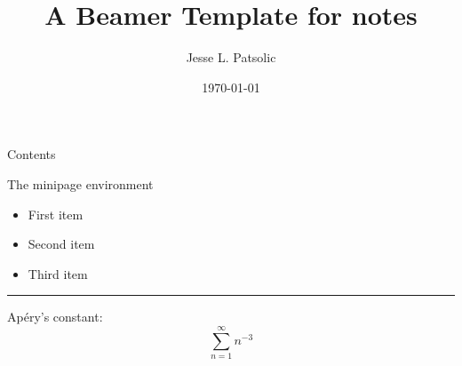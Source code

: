 \documentclass[xcolor=dvipsnames, aspectratio=169]{beamer}
\title[Daily Notes]{A Beamer Template for notes}
\subtitle[]{}
\author[JLP]{Jesse L. Patsolic}
\institute[JLP]{\texttt{[image: logoWhite.png]}}
\institute[JLP]{\texttt{[image: logo.png]}}
\date[]{\today}
\begin{document}
\begin{frame}
\titlepage
\end{frame}
\begin{frame}{Contents}
\tableofcontents
\end{frame}

\begin{frame}{The minipage environment}
\begin{minipage}{0.47\textwidth}
    \begin{itemize}
        \item First item
        \item Second item
        \item Third item
    \end{itemize}
\end{minipage}
\begin{minipage}{0.5\textwidth}
    \rule{\textwidth}{0.75\textwidth}
\end{minipage}
\end{frame}


\begin{frame}{}
Ap\'ery's constant:
\[
  \sum_{n=1}^{\infty}{n^{-3}}
\]
\end{frame}


\begin{frame}[plain]

\end{frame}
\end{document}
